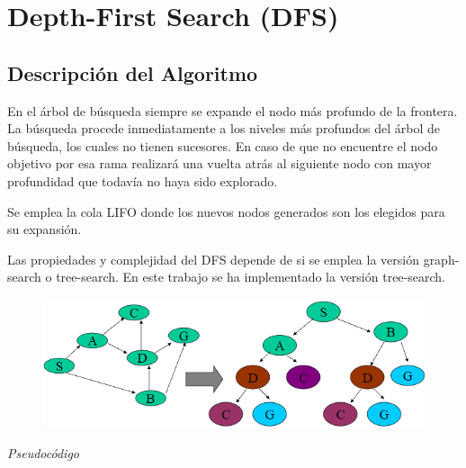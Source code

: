 \documentclass[conference]{IEEEtran}
\begin{document}
\section{Depth-First Search (DFS)}

\vspace{0.2mm}

{\setlength{\parskip}{1em}

\subsection{Descripci\'on del Algoritmo}

En el \'arbol de b\'usqueda siempre se expande el nodo m\'as profundo de la frontera. La búsqueda procede inmediatamente a los niveles m\'as profundos del \'arbol de b\'usqueda, los cuales no tienen sucesores. En caso de que no encuentre el nodo objetivo por esa rama realizar\'a una vuelta atr\'as al siguiente nodo con mayor profundidad que todav\'ia no haya sido explorado.

Se emplea la cola LIFO donde los nuevos nodos generados son los elegidos para su expansi\'on.

Las propiedades y complejidad del DFS depende de si se emplea la versión graph-search o tree-search. En este trabajo se ha implementado la versión tree-search.


\begin{figure}[H]
\centerline{\includegraphics[scale=0.4]{IMAGENES/Graph-search_Tree-search.png}}
\caption{}
\label{fig}
\end{figure}

\begin{center}
\textit{Pseudoc\'odigo}
\end{center}

}
\end{document}
